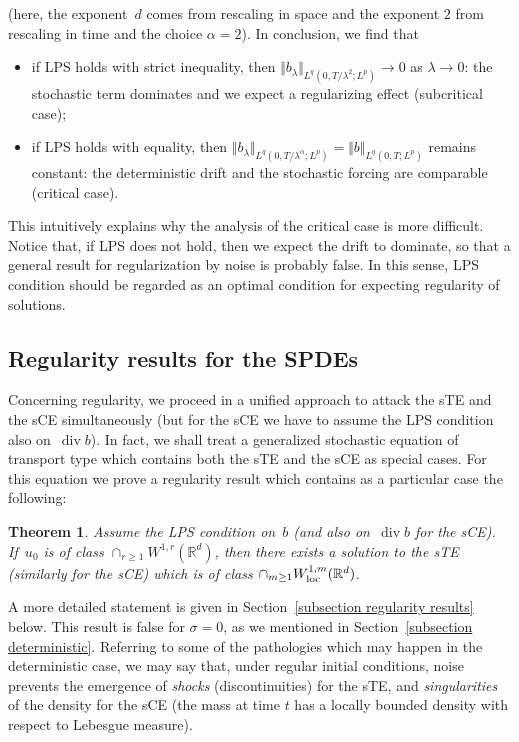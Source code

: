 \documentclass[a4paper,10pt]{article}
\newtheorem{theorem}{Theorem}[section]
\newcommand\1{\mathbbm{1}}
\newcommand\loc{{\rm loc}}
\DeclareMathOperator{\diverg}{div}
\numberwithin{equation}{section}
\begin{document}
(here, the exponent~$d$ comes from rescaling in space and the exponent $2$ from rescaling in time and the choice $\alpha =2$). In conclusion, we find that
\begin{itemize}
 \item if LPS holds with strict inequality, then $\Vert b_{\lambda}\Vert_{L^{q}(0,T/\lambda^{2};L^{p})} \to 0$ as $\lambda\rightarrow0$: the stochastic term dominates and we expect a regularizing effect (subcritical case);
 \item if LPS holds with equality, then $\Vert b_{\lambda}\Vert_{L^{q}(0,T/\lambda^{\alpha};L^{p}) }=\Vert b\Vert_{L^{q}(0,T;L^{p}) }$ remains constant: the deterministic drift and the stochastic forcing are comparable (critical case).
\end{itemize}

This intuitively explains why the analysis of the critical case is more difficult. Notice that, if LPS does not hold, then we expect the drift to dominate, so that a general result for regularization by noise is probably false. In this sense, LPS condition should be regarded as an optimal condition for expecting regularity of solutions.

\subsection{Regularity results for the SPDEs\label{intro section regularity}}

Concerning regularity, we proceed in a unified approach to attack the sTE and the sCE simultaneously (but for the sCE we have to assume the LPS condition also on~$\diverg b$). In fact, we shall treat a generalized stochastic equation of transport type which contains both the sTE and the sCE as special cases. For this equation we prove a regularity result which contains as a particular case the following:

\begin{theorem}
Assume the LPS condition on~$b$ \textup{(}and also on~$\diverg b$ for the sCE\textup{)}. If~$u_{0}$ is of class $\cap_{r\geq1}W^{1,r}(\mathbb{R}^{d})$, then there exists a solution to the sTE \textup{(}similarly for the sCE\textup{)} which is of class $\cap_{m\geq1}W_{\loc}^{1,m}( \mathbb{R}^{d})$.
\end{theorem}

A more detailed statement is given in Section~\ref{subsection regularity results} below. This result is false for $\sigma =0$, as we mentioned in Section~\ref{subsection deterministic}. Referring to some of the pathologies which may happen in the deterministic case, we may say that, under regular
initial conditions, noise prevents the emergence of \textit{shocks} (discontinuities) for the sTE, and \textit{singularities} of the density for
the sCE (the mass at time $t$ has a locally bounded density with respect to Lebesgue measure).
\end{document}
